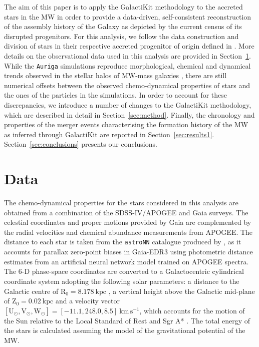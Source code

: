 The aim of this paper is to apply the GalactiKit methodology to the accreted stars in the MW in order to provide a data-driven, self-consistent reconstruction of the assembly history of the Galaxy as depicted by the current census of its disrupted progenitors. For this analysis, we follow the data construction and division of stars in their respective accreted progenitor of origin defined in \cite{Horta2023}. More details on the observational data used in this analysis are provided in Section~\ref{sec:data}. While the \texttt{Auriga} simulations reproduce morphological, chemical and dynamical trends observed in the stellar halos of MW-mass galaxies \citep{Monachesi2019}, there are still numerical offsets between the observed chemo-dynamical properties of stars and the ones of the particles in the simulations. In order to account for these discrepancies, we introduce a number of changes to the GalactiKit methodology, which are described in detail in Section~\ref{sec:method}. Finally, the chronology and properties of the merger events characterising the formation history of the MW as inferred through GalactiKit are reported in Section~\ref{sec:results1}. Section~\ref{sec:conclusions} presents our conclusions.



\section{Data}
\label{sec:data}
The chemo-dynamical properties for the stars considered in this analysis are obtained from a combination of the SDSS-IV/APOGEE \citep[DR17,][]{Majewski2017,Abdurrouf2022} and Gaia \citep[EDR3,][]{GaiaCollaboration2021} surveys. The celestial coordinates and proper motions provided by Gaia are complemented by the radial velocities and chemical abundance measurements from APOGEE. The distance to each star is taken from the \texttt{astroNN} catalogue produced by \citet{Leung2019}, as it accounts for parallax zero-point biases in Gaia-EDR3 using photometric distance estimates from an artificial neural network model trained on APOGEE spectra. The 6-D phase-space coordinates are converted to a Galactocentric cylindrical coordinate system adopting the following solar parameters: a distance to the Galactic centre of $\mathrm{R}_{0}=8.178~\mathrm{kpc}$ \citep{GRAVITYCollaboration2019}, a vertical height above the Galactic mid-plane of $\mathrm{Z}_{0}=0.02~\mathrm{kpc}$ \citep{Bennett2019} and a velocity vector $[\mathrm{U_{\odot}}, \mathrm{V}_{\odot}, \mathrm{W}_{\odot}]=[-11.1,248.0,8.5]~\mathrm{km\,s^{-1}}$, which  accounts for the motion of the Sun relative to the Local Standard of Rest and Sgr A* \citep{Schonrich2010,Reid2020}.
The total energy of the stars is calculated assuming the \citet{McMillan2017} model of the gravitational potential of the MW.

